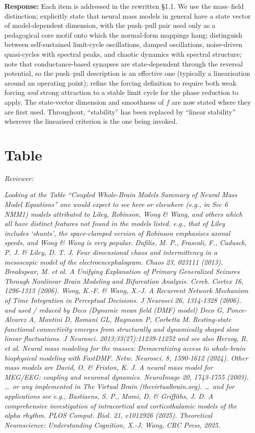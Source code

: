\documentclass[12pt,a4paper]{article}
\newcommand{\reviewercomment}[1]{\par\smallskip\noindent\textit{Reviewer:}\par\smallskip\begingroup\itshape #1\par\endgroup\smallskip}
\newcommand{\ourresponse}[1]{\par\noindent\textbf{Response:} #1\par\medskip}
\begin{document}
\ourresponse{Each item is addressed in the rewritten §1.1. We use the mass--field distinction; explicitly state that neural mass models in general have a state vector of model-dependent dimension, with the push--pull pair used only as a pedagogical core motif onto which the normal-form mappings hang; distinguish between self-sustained limit-cycle oscillations, damped oscillations, noise-driven quasi-cycles with spectral peaks, and chaotic dynamics with spectral structure; note that conductance-based synapses are state-dependent through the reversal potential, so the push--pull description is an effective one (typically a linearisation around an operating point); refine the forcing definition to require both weak forcing \emph{and} strong attraction to a stable limit cycle for the phase reduction to apply. The state-vector dimension and smoothness of $f$ are now stated where they are first used. Throughout, ``stability'' has been replaced by ``linear stability'' wherever the linearised criterion is the one being invoked.}

\section*{Table}

\reviewercomment{Looking at the Table ``Coupled Whole-Brain Models Summary of Neural Mass Model Equations'' one would expect to see here or elsewhere (e.g., in Sec 6 NMM1) models attributed to Liley, Robinson, Wong \& Wang, and others which all have distinct features not found in the models listed. e.g., that of Liley includes `shunts', the space-clamped version of Robinson emphasises axonal speeds, and Wong \& Wang is very popular. Dafilis, M. P., Frascoli, F., Cadusch, P. J. \& Liley, D. T. J. Four dimensional chaos and intermittency in a mesoscopic model of the electroencephalogram. Chaos 23, 023111 (2013). Breakspear, M. et al. A Unifying Explanation of Primary Generalized Seizures Through Nonlinear Brain Modeling and Bifurcation Analysis. Cereb. Cortex 16, 1296-1313 (2006). Wong, K.-F. \& Wang, X.-J. A Recurrent Network Mechanism of Time Integration in Perceptual Decisions. J Neurosci 26, 1314-1328 (2006). and used / reduced by Deco (Dynamic mean field (DMF) model) Deco G, Ponce-Alvarez A, Mantini D, Romani GL, Hagmann P, Corbetta M. Resting-state functional connectivity emerges from structurally and dynamically shaped slow linear fluctuations. J Neurosci. 2013;33(27):11239-11252 and see also Herzog, R. et al. Neural mass modeling for the masses: Democratizing access to whole-brain biophysical modeling with FastDMF. Netw. Neurosci. 8, 1590-1612 (2024). Other mass models are David, O. \& Friston, K. J. A neural mass model for MEG/EEG: coupling and neuronal dynamics. NeuroImage 20, 1743-1755 (2003). \dots\ or any implemented in The Virtual Brain (thevirtualbrain.org). \dots\ and for applications see e.g., Bastiaens, S. P., Momi, D. \& Griffiths, J. D. A comprehensive investigation of intracortical and corticothalamic models of the alpha rhythm. PLOS Comput. Biol. 21, e1012926 (2025). Theoretical Neuroscience: Understanding Cognition, X.-J. Wang, CRC Press, 2025.}
\end{document}
